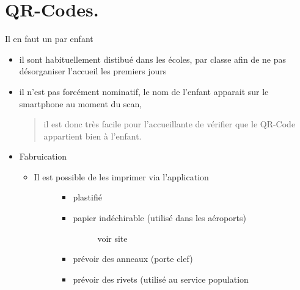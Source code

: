 \documentclass[letterpaper,10pt,english]{sphinxmanual}
\begin{document}
\section{QR-Codes.}
\label{checklist:qr-codes}
Il en faut un par enfant
\begin{itemize}
\item {} 
il sont habituellement distibué dans les écoles, par classe afin de ne pas désorganiser l'accueil les premiers jours

\item {} 
il n'est pas forcément nominatif, le nom de l'enfant apparait sur le smartphone au moment du scan,
\begin{quote}

il est donc très facile pour l'accueillante de vérifier que le QR-Code appartient bien à l'enfant.
\end{quote}

\item {} 
Fabruication
\begin{itemize}
\item {} \begin{description}
\item[{Il est possible de les imprimer via l'application}] \leavevmode\begin{itemize}
\item {} 
plastifié

\item {} \begin{description}
\item[{papier indéchirable (utilisé dans les aéroports)}] \leavevmode
voir site

\end{description}

\item {} 
prévoir des anneaux (porte clef)

\item {} 
prévoir des rivets (utilisé au service population

\end{itemize}

\end{description}

\end{itemize}

\end{itemize}
\end{document}
